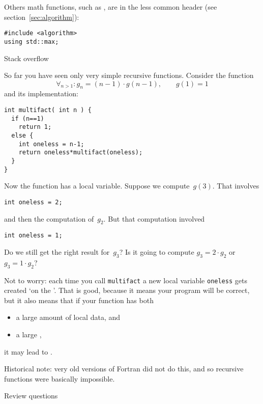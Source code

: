 Others math functions, such as ,
are in the less common  header
(see section~\ref{sec:algorithm}):
\begin{lstlisting}
#include <algorithm>
using std::max;
\end{lstlisting}


 {Stack overflow}

So far you have seen only very simple recursive functions. Consider
the function
\[ \forall_{n>1}\colon g_n = (n-1)\cdot g(n-1),\qquad g(1)=1 \]
and its implementation:
\begin{lstlisting}
int multifact( int n ) {
  if (n==1)
    return 1;
  else {
    int oneless = n-1;
    return oneless*multifact(oneless);
  }
}
\end{lstlisting}
Now the function has a local variable. Suppose we compute~$g(3)$. That
involves
\begin{lstlisting}
int oneless = 2;
\end{lstlisting}
and then the computation of~$g_2$. But that computation involved 
\begin{lstlisting}
int oneless = 1;
\end{lstlisting}
Do we still get the right result for~$g_3$? Is it going to compute
$g_3=2\cdot g_2$ or $g_3=1\cdot g_2$?

Not to worry: each time you call \lstinline{multifact} a new local variable
\lstinline{oneless} gets created `on the '.
That is good, because it means your program
will be correct, but it also means that if your function has both
\begin{itemize}
\item a large amount of local data, and
\item a large ,
\end{itemize}
it may lead to .

\begin{remark}
  Historical note: very old versions of Fortran
  did not do this, and so recursive functions were basically
  impossible.
\end{remark}

 {Review questions}

